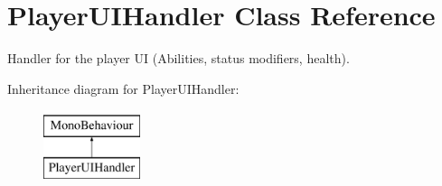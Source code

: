 \hypertarget{class_player_u_i_handler}{}\section{Player\+U\+I\+Handler Class Reference}
\label{class_player_u_i_handler}


Handler for the player UI (Abilities, status modifiers, health).  


Inheritance diagram for Player\+U\+I\+Handler\+:\begin{figure}[H]
\begin{center}
\leavevmode
\includegraphics[height=2.000000cm]{class_player_u_i_handler}
\end{center}
\end{figure}
